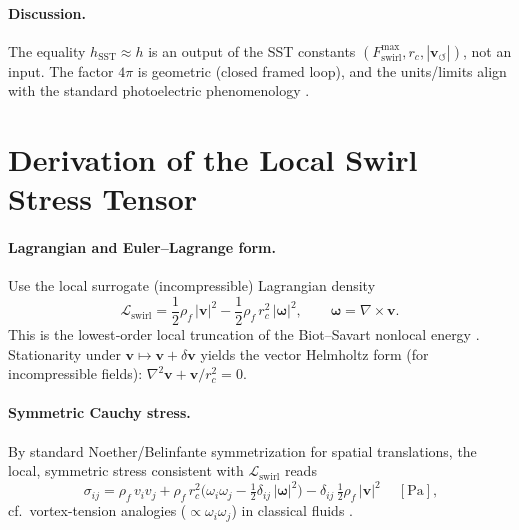 \documentclass[10pt,reprint,aps,onecolumn,nofootinbib]{revtex4-2}
\begin{document}
    \paragraph{Discussion.}
        The equality \(h_{\mathrm{SST}}\approx h\) is an output of the SST constants \((F_{\text{swirl}}^{\max}, r_c, |\mathbf{v}_{\!\boldsymbol{\circlearrowleft}}|)\), not an input. The factor \(4\pi\) is geometric (closed framed loop), and the units/limits align with the standard photoelectric phenomenology \cite{Einstein1905}.

\section{Derivation of the Local Swirl Stress Tensor}\label{app:swirl-stress-derivation}

    \paragraph{Lagrangian and Euler–Lagrange form.}
        Use the local surrogate (incompressible) Lagrangian density
        \begin{equation}
        \mathcal{L}_{\text{swirl}}=\frac{1}{2}\rho_{\!f}\,|\mathbf{v}|^{2}
        -\frac{1}{2}\rho_{\!f}\,r_c^{2}\,|\boldsymbol{\omega}|^{2},
        \qquad \boldsymbol{\omega}=\nabla\times\mathbf{v}.
        \end{equation}
        This is the lowest‐order local truncation of the Biot–Savart nonlocal energy
        \cite{Saffman1992,Batchelor1967,LandauFM}.
        Stationarity under \(\mathbf{v}\mapsto \mathbf{v}+\delta\mathbf{v}\) yields the vector Helmholtz form
        (for incompressible fields): \(\nabla^{2}\mathbf{v}+\mathbf{v}/r_c^{2}=0\).

    \paragraph{Symmetric Cauchy stress.}
        By standard Noether/Belinfante symmetrization for spatial translations, the local, symmetric stress consistent with \(\mathcal{L}_{\text{swirl}}\) reads
        \begin{equation}
        \boxed{~
        \sigma_{ij}
            =\rho_{\!f}\,v_i v_j
            +\rho_{\!f}\,r_c^{2}\Big(\omega_i\omega_j-\tfrac12 \delta_{ij}\,|\boldsymbol{\omega}|^{2}\Big)
            -\delta_{ij}\,\tfrac12 \rho_{\!f}\,|\mathbf{v}|^{2}
            ~}\quad [\mathrm{Pa}],
        \end{equation}
        cf.\ vortex-tension analogies (\( \propto \omega_i\omega_j\)) in classical fluids
        \cite{Saffman1992,Batchelor1967,LandauFM}.
\end{document}
